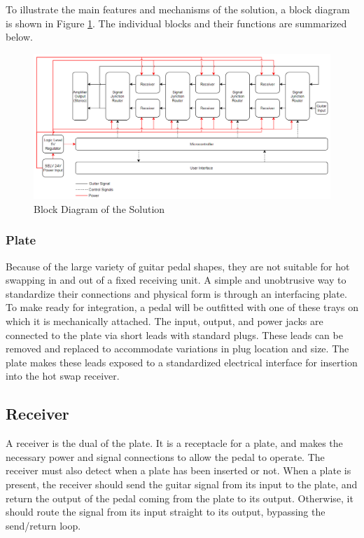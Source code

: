 \documentclass{article}
\begin{document}
	To illustrate the main features and mechanisms of the solution, a block diagram is shown in Figure \ref{fig:SystemBlockDiagram}.  The individual blocks and their functions are summarized below.

	\begin{figure}
		\centering
		\includegraphics[width = \textwidth]{PR2Images/SystemBlockDiagram.PNG}
		\caption{Block Diagram of the Solution}
		\label{fig:SystemBlockDiagram}
	\end{figure}

	\subsubsection{Plate}
	Because of the large variety of guitar pedal shapes, they are not suitable for hot swapping in and out of a fixed receiving unit.  A simple and unobtrusive way to standardize their connections and physical form is through an interfacing plate.  To make ready for integration, a pedal will be outfitted with one of these trays on which it is mechanically attached.  The input, output, and power jacks are connected to the plate via short leads with standard plugs.  These leads can be removed and replaced to accommodate variations in plug location and size.  The plate makes these leads exposed to a standardized electrical interface for insertion into the hot swap receiver.

	\subsection{Receiver}
	A receiver is the dual of the plate.  It is a receptacle for a plate, and makes the necessary power and signal connections to allow the pedal to operate.  The receiver must also detect when a plate has been inserted or not.  When a plate is present, the receiver should send the guitar signal from its input to the plate, and return the output of the pedal coming from the plate to its output.  Otherwise, it should route the signal from its input straight to its output, bypassing the send/return loop.
\end{document}
